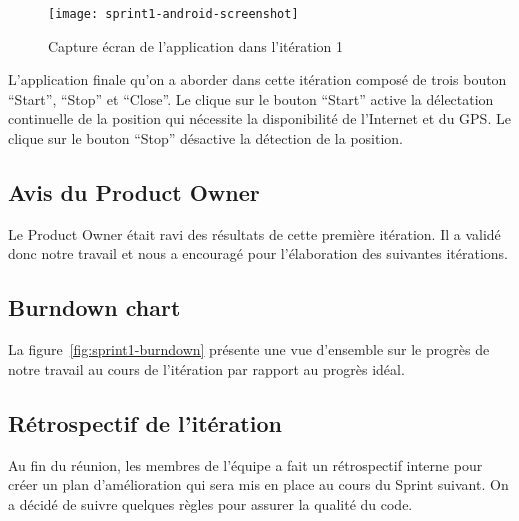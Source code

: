 \begin{figure}[H]
    \centering
    \texttt{[image: sprint1-android-screenshot]}
    \caption{Capture écran de l'application dans l'itération 1}
\label{fig:sprint1-android-screenshot}
\end{figure}

L'application finale qu'on a aborder dans cette itération composé de trois
bouton ``Start'', ``Stop'' et ``Close''.  Le clique sur le bouton ``Start''
active la délectation continuelle de la position qui nécessite la disponibilité
de l'Internet et du \acrshort{GPS}.  Le clique sur le bouton ``Stop'' désactive
la détection de la position.

\subsection{Avis du Product Owner}

Le Product Owner était ravi des résultats de cette première itération. Il a
validé donc notre travail et nous a encouragé pour l'élaboration des suivantes
itérations.

\subsection{Burndown chart}

La figure~\ref{fig:sprint1-burndown} présente une vue d'ensemble sur le progrès
de notre travail au cours de l'itération par rapport au progrès idéal.



\subsection{Rétrospectif de l'itération}

Au fin du réunion, les membres de l'équipe a fait un rétrospectif interne pour
créer un plan d'amélioration qui sera mis en place au cours du Sprint suivant.
On a décidé de suivre quelques règles pour assurer la qualité du code.

